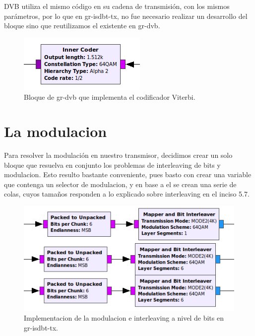 	DVB utiliza el mismo código en su cadena de transmisión, con los mismos parámetros, por lo que en gr-isdbt-tx, no fue necesario realizar un desarrollo del bloque sino que reutilizamos el existente en gr-dvb. 
	
	\begin{figure}[h!]
		\centering
		\includegraphics[scale=0.5]{figuras/cap05/inner}
		\caption{\label{f:inner} Bloque de gr-dvb que implementa el codificador Viterbi.}
	\end{figure}
	
\section{La modulacion}

Para resolver la modulación en nuestro transmisor, decidimos crear un solo bloque que resuelva en conjunto los problemas de interleaving de bits y modulacion. Esto resulto bastante conveniente, pues basto con crear una variable que contenga un selector de modulacion, y en base a el se crean una serie de colas, cuyos tamaños responden a lo explicado sobre interleaving en el inciso 5.7.

\begin{figure}[h!]
	\centering
	\includegraphics[scale=0.5]{figuras/cap05/modulacion}
	\caption{\label{f:modulacion} Implementacion de la modulacion e interleaving a nivel de bits en gr-isdbt-tx.}
\end{figure}


